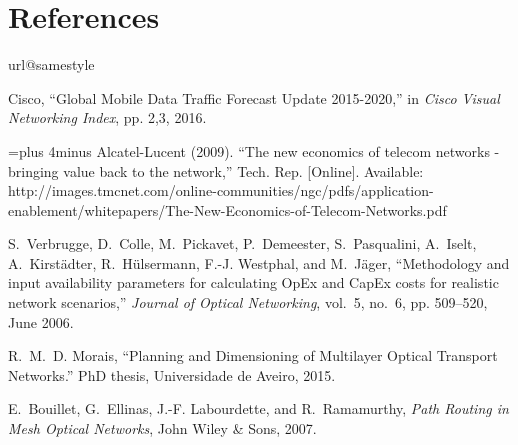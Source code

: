 \chapter*{References}

\renewcommand{\bibname}{References}
%
%
%
%
\begin{thebibliography}{10}
\providecommand{\url}[1]{#1}
\csname url@samestyle\endcsname
\providecommand{\newblock}{\relax}
\providecommand{\bibinfo}[2]{#2}
\providecommand{\BIBentrySTDinterwordspacing}{\spaceskip=0pt\relax}
\providecommand{\BIBentryALTinterwordstretchfactor}{4}
\providecommand{\BIBentryALTinterwordspacing}{\spaceskip=\fontdimen2\font plus
\BIBentryALTinterwordstretchfactor\fontdimen3\font minus
  \fontdimen4\font\relax}
\providecommand{\BIBforeignlanguage}[2]{{%
\expandafter\ifx\csname l@#1\endcsname\relax
\typeout{** WARNING: IEEEtran.bst: No hyphenation pattern has been}%
\typeout{** loaded for the language `#1'. Using the pattern for}%
\typeout{** the default language instead.}%
\else
\language=\csname l@#1\endcsname
\fi
#2}}
\providecommand{\BIBdecl}{\relax}
\BIBdecl

Cisco, ``Global Mobile Data Traffic Forecast Update 2015-2020,'' in \emph{Cisco Visual Networking Index}, pp. 2,3, 2016.

\BIBentryALTinterwordspacing
Alcatel-Lucent (2009). ``The new economics of telecom networks - bringing value back to the network,'' Tech. Rep. [Online]. Available:
  \url{http://images.tmcnet.com/online-communities/ngc/pdfs/application-enablement/whitepapers/The-New-Economics-of-Telecom-Networks.pdf}
\BIBentrySTDinterwordspacing

S.~Verbrugge, D.~Colle, M.~Pickavet, P.~Demeester, S.~Pasqualini, A.~Iselt, A.~Kirst\"{a}dter, R.~H\"{u}lsermann, F.-J. Westphal, and M.~J\"{a}ger, ``Methodology and input availability parameters for calculating OpEx and CapEx costs for realistic network scenarios,'' \emph{Journal of Optical Networking}, vol.~5, no.~6, pp. 509--520, June 2006.

R.~M.~D. Morais, ``Planning and Dimensioning of Multilayer Optical Transport Networks.'' PhD thesis, Universidade de Aveiro, 2015.

E.~Bouillet, G.~Ellinas, J.-F. Labourdette, and R.~Ramamurthy, \emph{Path Routing in Mesh Optical Networks}, John Wiley \& Sons, 2007.


\end{thebibliography}
